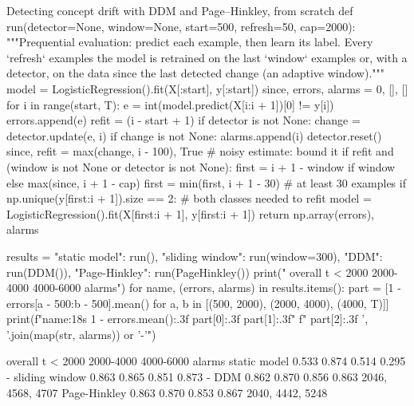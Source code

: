 \begin{pylisting}[label={lst:conceptdrift}]{Detecting concept drift with DDM and Page--Hinkley, from scratch}
def run(detector=None, window=None, start=500, refresh=50, cap=2000):
    """Prequential evaluation: predict each example, then learn its label. Every `refresh`
    examples the model is retrained on the last `window` examples or, with a detector,
    on the data since the last detected change (an adaptive window)."""
    model = LogisticRegression().fit(X[:start], y[:start])
    since, errors, alarms = 0, [], []
    for i in range(start, T):
        e = int(model.predict(X[i:i + 1])[0] != y[i])
        errors.append(e)
        refit = (i - start + 1) %
        if detector is not None:
            change = detector.update(e, i)
            if change is not None:
                alarms.append(i)
                detector.reset()
                since, refit = max(change, i - 100), True   # noisy estimate: bound it
        if refit and (window is not None or detector is not None):
            first = i + 1 - window if window else max(since, i + 1 - cap)
            first = min(first, i + 1 - 30)           # at least 30 examples
            if np.unique(y[first:i + 1]).size == 2:    # both classes needed to refit
                model = LogisticRegression().fit(X[first:i + 1], y[first:i + 1])
    return np.array(errors), alarms

results = {"static model": run(), "sliding window": run(window=300),
           "DDM": run(DDM()), "Page-Hinkley": run(PageHinkley())}
print("                  overall   t < 2000   2000-4000   4000-6000   alarms")
for name, (errors, alarms) in results.items():
    part = [1 - errors[a - 500:b - 500].mean() for a, b in [(500, 2000), (2000, 4000),
                                                           (4000, T)]]
    print(f"{name:18s} {1 - errors.mean():.3f}     {part[0]:.3f}      {part[1]:.3f}"
          f"       {part[2]:.3f}    {', '.join(map(str, alarms)) or '-'}")
\end{pylisting}
\begin{pyoutput}
                  overall   t < 2000   2000-4000   4000-6000   alarms
static model       0.533     0.874      0.514       0.295    -
sliding window     0.863     0.865      0.851       0.873    -
DDM                0.862     0.870      0.856       0.863    2046, 4568, 4707
Page-Hinkley       0.863     0.870      0.853       0.867    2040, 4442, 5248
\end{pyoutput}

